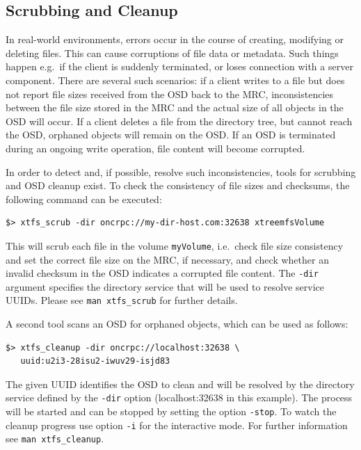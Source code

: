 \documentclass[a4paper,10pt]{book}
\begin{document}
\subsection{Scrubbing and Cleanup}

In real-world environments, errors occur in the course of creating, modifying or deleting files. This can cause corruptions of file data or metadata. Such things happen e.g.\ if the client is suddenly terminated, or loses connection with a server component. There are several such scenarios: if a client writes to a file but does not report file sizes received from the OSD back to the MRC, inconsistencies between the file size stored in the MRC and the actual size of all objects in the OSD will occur. If a client deletes a file from the directory tree, but cannot reach the OSD, orphaned objects will remain on the OSD. If an OSD is terminated during an ongoing write operation, file content will become corrupted.

In order to detect and, if possible, resolve such inconsistencies, tools for scrubbing and OSD cleanup exist. To check the consistency of file sizes and checksums, the following command can be executed:

\begin{verbatim}
$> xtfs_scrub -dir oncrpc://my-dir-host.com:32638 xtreemfsVolume
\end{verbatim}

This will scrub each file in the volume \texttt{myVolume}, i.e.\ check file size consistency and set the correct file size on the MRC, if necessary, and check whether an invalid checksum in the OSD indicates a corrupted file content. The \texttt{-dir} argument specifies the directory service that will be used to resolve service UUIDs. Please see \texttt{man xtfs\_scrub} for further details.

A second tool scans an OSD for orphaned objects, which can be used as follows:

\begin{verbatim}
$> xtfs_cleanup -dir oncrpc://localhost:32638 \
   uuid:u2i3-28isu2-iwuv29-isjd83
\end{verbatim}
The given UUID identifies the OSD to clean and will be resolved by the
directory service defined by the \texttt{-dir} option (localhost:32638 in this example).
The process will be started and can be stopped by setting the option
\texttt{-stop}. To watch the cleanup progress use option \texttt{-i} for the
interactive mode. For further information see \texttt{man xtfs\_cleanup}.
\end{document}
